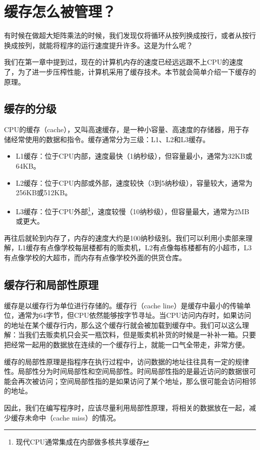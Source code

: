 \documentclass[../main.tex]{subfiles}
\begin{document}
\section{缓存怎么被管理？}

有时候在做超大矩阵乘法的时候，我们发现仅将循环从按列换成按行，或者从按行换成按列，就能将程序的运行速度提升许多。这是为什么呢？

我们在第一章中提到过，现在的计算机内存的速度已经远远跟不上CPU的速度了，为了进一步压榨性能，计算机采用了缓存技术。本节就会简单介绍一下缓存的原理。

\subsection{缓存的分级}

CPU的缓存（cache），又叫高速缓存，是一种小容量、高速度的存储器，用于存储经常使用的数据和指令。缓存通常分为三级：L1、L2和L3缓存。
\begin{itemize}
  \item L1缓存：位于CPU内部，速度最快（1纳秒级），但容量最小，通常为32KB或64KB。
  \item L2缓存：位于CPU内部或外部，速度较快（3到5纳秒级），容量较大，通常为256KB或512KB。
  \item L3缓存：位于CPU外部\footnote{现代CPU通常集成在内部做多核共享缓存}，速度较慢（10纳秒级），但容量最大，通常为2MB或更大。
\end{itemize}
再往后就轮到内存了，内存的速度大约是100纳秒级别。我们可以利用小卖部来理解，L1缓存有点像学校每层楼都有的贩卖机，L2有点像每栋楼都有的小超市，L3有点像学校的大超市，而内存有点像学校外面的供货仓库。

\subsection{缓存行和局部性原理}

缓存是以缓存行为单位进行存储的。缓存行（cache line）是缓存中最小的传输单位，通常为64字节，但CPU依然能够按字节寻址。当CPU访问内存时，如果访问的地址在某个缓存行内，那么这个缓存行就会被加载到缓存中。我们可以这么理解：当我们去贩卖机只会买一瓶饮料，但是贩卖机补货的时候是一补补一箱。只要把经常一起用的数据放在连续的一个缓存行上，就能一口气全带走，非常方便。

缓存的局部性原理是指程序在执行过程中，访问数据的地址往往具有一定的规律性。局部性分为时间局部性和空间局部性。时间局部性指的是最近访问的数据很可能会再次被访问；空间局部性指的是如果访问了某个地址，那么很可能会访问相邻的地址。

因此，我们在编写程序时，应该尽量利用局部性原理，将相关的数据放在一起，减少缓存未命中（cache miss）的情况。
\end{document}
